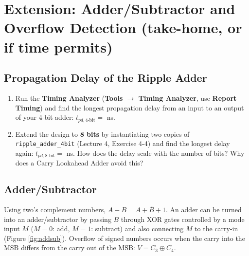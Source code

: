 \documentclass{article}
\begin{document}
\section*{Extension: Adder/Subtractor and Overflow Detection (take-home, or if time permits)}

\subsection*{Propagation Delay of the Ripple Adder}
\begin{enumerate}
    \item Run the \textbf{Timing Analyzer} (\textbf{Tools $\rightarrow$ Timing Analyzer}, use \textbf{Report Timing}) and find the longest propagation delay from an input to an output of your 4-bit adder: $t_{pd,4\text{-bit}} = $ \underline{\hspace{2cm}} ns.
    \item Extend the design to \textbf{8 bits} by instantiating two copies of \texttt{ripple\_adder\_4bit} (Lecture 4, Exercise 4-4) and find the longest delay again: $t_{pd,8\text{-bit}} = $ \underline{\hspace{2cm}} ns. How does the delay scale with the number of bits? Why does a Carry Lookahead Adder avoid this?
\end{enumerate}

\subsection*{Adder/Subtractor}
Using two's complement numbers, $A - B = A + \overline{B} + 1$. An adder can be turned into an adder/subtractor by passing $B$ through XOR gates controlled by a mode input $M$ ($M=0$: add, $M=1$: subtract) and also connecting $M$ to the carry-in (Figure \ref{fig:addsub}). Overflow of signed numbers occurs when the carry into the MSB differs from the carry out of the MSB: $V = C_3 \oplus C_4$.
\end{document}
